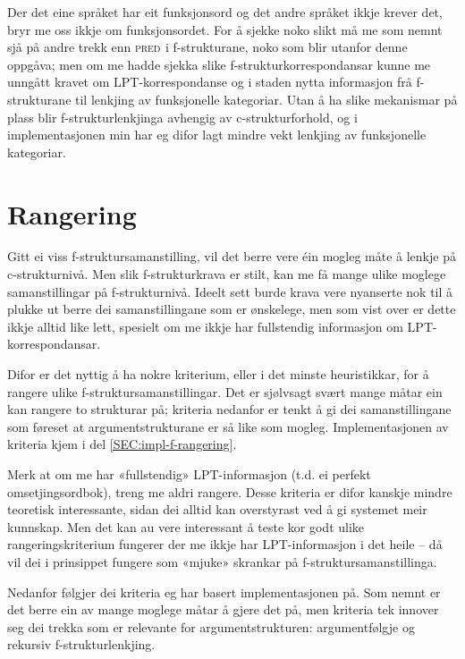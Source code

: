 \documentclass[11pt,a4paper,oneside,draft]{book}
\newcommand{\F}[2]{\textsc{#1}\ensuremath{_{#2}}}
\newcommand{\PRED}{\F{pred}{}}
\begin{document}
Der det eine språket har eit funksjonsord og det andre språket ikkje
krever det, bryr me oss ikkje om funksjonsordet. For å sjekke noko
slikt må me som nemnt sjå på andre trekk enn \PRED{} i f-strukturane,
noko som blir utanfor denne oppgåva; men om me hadde sjekka slike
f-strukturkorrespondansar kunne me unngått kravet om
LPT-korrespondanse og i staden nytta informasjon frå f-strukturane til
lenkjing av funksjonelle kategoriar. Utan å ha slike mekanismar på
plass blir f-strukturlenkjinga avhengig av c-strukturforhold, og i
implementasjonen min har eg difor lagt mindre vekt lenkjing av
funksjonelle kategoriar.

\section{Rangering}
\label{sec-3.8}

   \label{SEC:rangering}

Gitt ei viss f-struktursamanstilling, vil det berre vere éin mogleg
måte å lenkje på c-strukturnivå. Men slik f-strukturkrava er stilt,
kan me få mange ulike moglege samanstillingar på
f-strukturnivå. Ideelt sett burde krava vere nyanserte nok til å
plukke ut berre dei samanstillingane som er ønskelege, men som vist
over er dette ikkje alltid like lett, spesielt om me ikkje har
fullstendig informasjon om LPT-korrespondansar.

Difor er det nyttig å ha nokre kriterium, eller i det minste
heuristikkar, for å rangere ulike f-struktursamanstillingar. Det er
sjølvsagt svært mange måtar ein kan rangere to strukturar på; kriteria
nedanfor er tenkt å gi dei samanstillingane som føreset at
argumentstrukturane er så like som mogleg. Implementasjonen av
kriteria kjem i del \ref{SEC:impl-f-rangering}.

Merk at om me har «fullstendig» LPT-informasjon (t.d. ei perfekt
omsetjingsordbok), treng me aldri rangere. Desse kriteria er difor
kanskje mindre teoretisk interessante, sidan dei alltid kan
overstyrast ved å gi systemet meir kunnskap. Men det kan au vere
interessant å teste kor godt ulike rangeringskriterium fungerer der me
ikkje har LPT-informasjon i det heile -- då vil dei i prinsippet
fungere som «mjuke» skrankar på f-struktursamanstillinga.

Nedanfor følgjer dei kriteria eg har basert implementasjonen på. Som
nemnt er det berre ein av mange moglege måtar å gjere det på, men
kriteria tek innover seg dei trekka som er relevante for
argumentstrukturen: argumentfølgje og rekursiv f-strukturlenkjing.
\end{document}
